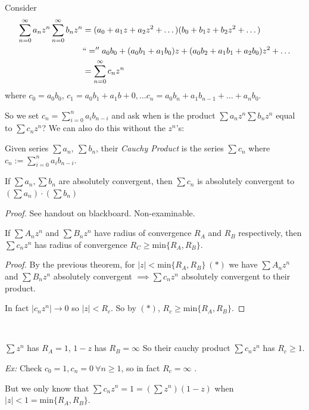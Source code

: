 \documentclass[twoside]{scrartcl}
\begin{document}
Consider 
\[\begin{aligned}
\sum_{n=0}^{\infty} a_nz^n \sum_{n=0}^{\infty}b_nz^n &= (a_0 + a_1z + a_2z^2 + \dots) (b_0 + b_1z + b_2z^2 + \dots)\\
&``='' a_0b_0 + (a_0b_1 + a_1b_0)z + (a_0b_2 + a_1b_1 + a_2b_0)z^2 + \dots \\
&= \sum_{n=0}^{\infty} c_nz^n 	
\end{aligned}
\]
where $c_0 = a_0b_0$, $c_1 = a_0b_1 + a_1b+0, \dots c_n = a_0b_n + a_1b_{n-1} + \dots + a_nb_0$. 

So we set $c_n = \sum_{i=0}^{n} a_i b_{n-i}$ and ask when is the product $\sum a_nz^n \sum b_nz^n$ equal to $\sum c_nz^n$? We can also do this without the $z^n$'s:\\

\begin{definition}
Given series $\sum a_n,~\sum b_n$, their \emph{Cauchy Product} is the series $\sum c_n$ where $c_n := \sum_{i=0}^n a_ib_{n-i}$.	
\end{definition}\vspace*{5pt}

\begin{theorem}
If $\sum a_n, \sum b_n$ are absolutely convergent, then $\sum c_n$ is absolutely convergent to $(\sum a_n) \cdot (\sum b_n)$	
\end{theorem}
\textit{Proof.}
See handout on blackboard. Non-examinable. \\

\begin{corollary}
If $\sum A_nz^n$ and $\sum B_nz^n$ have radius of convergence $R_A$ and $R_B$ respectively, then $\sum c_nz^n$ has radius of convergence $R_C \geq \mathrm{min}\{R_A,R_B\}$.	
\end{corollary}
\begin{proof}
By the previous theorem, for $|z| < \mathrm{min}\{R_A,R_B\} ~(*)$ we have $\sum A_nz^n$ and $\sum B_nz^n$ absolutely convergent $\implies \sum c_nz^n$ absolutely convergent to their product. 

In fact $|c_nz^n| \to 0$ so $|z| < R_c$. So by $(*)$, $R_c \geq \mathrm{min}\{R_A,R_B\}$.
\end{proof}~

\begin{example}
$\sum z^n$ has $R_A = 1$, $1-z$ has $R_B = \infty$ So their cauchy product $\sum c_nz^n$ has $R_c \geq 1$. 

\emph{Ex:} Check $c_0 = 1, c_n = 0~\forall n \geq 1$, so in fact $R_c = \infty$	.

But we only know that $\sum c_n z^n = 1 = (\sum z^n)(1-z)$ when $|z| < 1 = \mathrm{min}\{R_A,R_B\}$. 
\end{example}\vspace*{5pt}
\end{document}
